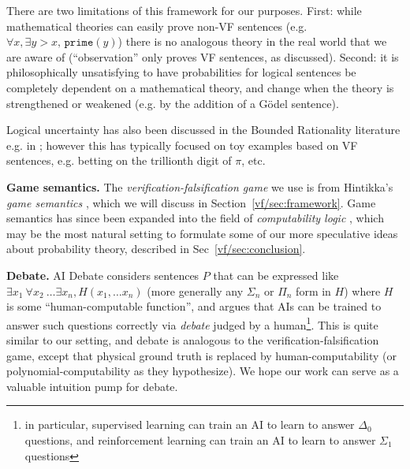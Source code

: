 There are two limitations of this framework for our purposes. First: while mathematical theories can easily prove non-VF sentences (e.g. $\forall x,\exists y>x,\,\texttt{prime}(y)$) there is no analogous theory in the real world that we are aware of (``observation'' only proves VF sentences, as discussed). Second: it is philosophically unsatisfying to have probabilities for logical sentences be completely dependent on a mathematical theory, and change when the theory is strengthened or weakened (e.g. by the addition of a G\"odel sentence).

Logical uncertainty has also been discussed in the Bounded Rationality literature e.g. in \cite{halpernAlgorithmicRationalityGame2014,halpernDontWantThink2011,oesterheldTheoryBoundedInductive2023}; however this has typically focused on toy examples based on VF sentences, e.g. betting on the trillionth digit of $\pi$, etc.

\textbf{Game semantics.} The \emph{verification-falsification game} we use is from Hintikka's \emph{game semantics} \cite{hintikkaGameTheoreticSemantics1997}, which we will discuss in Section~\ref{vf/sec:framework}. Game semantics has since been expanded into the field of \emph{computability logic} \cite{japaridzeBeginningWasGame2009,japaridzeSurveyComputabilityLogic2015}, which may be the most natural setting to formulate some of our more speculative ideas about probability theory, described in Sec~\ref{vf/sec:conclusion}.

\textbf{Debate.} AI Debate \cite{irvingAISafetyDebate2018} considers sentences $P$ that can be expressed like $\exists x_1\ \forall x_2\ \dots \exists x_n,H(x_1,\dots x_n)$ (more generally any $\Sigma_n$ or $\Pi_n$ form in $H$) where $H$ is some ``human-computable function'', and argues that AIs can be trained to answer such questions correctly via \emph{debate} judged by a human\footnote{in particular, supervised learning can train an AI to learn to answer $\Delta_0$ questions, and reinforcement learning can train an AI to learn to answer $\Sigma_1$ questions}. This is quite similar to our setting, and debate is analogous to the verification-falsification game, except that physical ground truth is replaced by human-computability (or polynomial-computability as they hypothesize). We hope our work can serve as a valuable intuition pump for debate.


